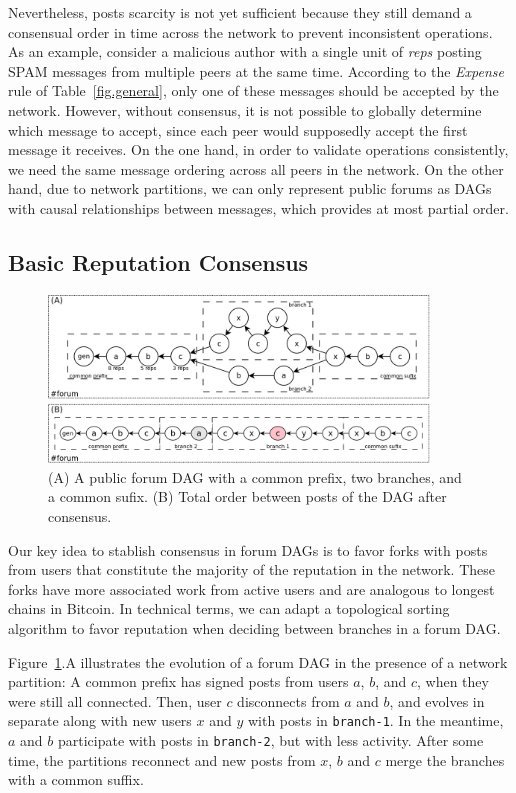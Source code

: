 \documentclass[12pt]{article}
\newcommand{\reps}     {\emph{reps}\xspace}
\newcommand{\code}[1]  {\texttt{\footnotesize{#1}}}
\begin{document}
Nevertheless, posts scarcity is not yet sufficient because they still demand a
consensual order in time across the network to prevent inconsistent operations.
As an example, consider a malicious author with a single unit of \reps posting
SPAM messages from multiple peers at the same time.
According to the \emph{Expense} rule of Table~\ref{fig.general}, only one of
these messages should be accepted by the network.
However, without consensus, it is not possible to globally determine which
message to accept, since each peer would supposedly accept the first message it
receives.
On the one hand, in order to validate operations consistently, we need the same
message ordering across all peers in the network.
On the other hand, due to network partitions, we can only represent public
forums as DAGs with causal relationships between messages, which provides at
most partial order.

\subsection{Basic Reputation Consensus}

\begin{figure}
\centering
\includegraphics[width=0.9\textwidth]{reps.png}
\caption{
    (A) A public forum DAG with a common prefix, two branches, and a common sufix.
    (B) Total order between posts of the DAG after consensus.
}
\label{fig.reps}
\end{figure}

Our key idea to stablish consensus in forum DAGs is to favor forks with posts
from users that constitute the majority of the reputation in the network.
These forks have more associated work from active users and are analogous to
longest chains in Bitcoin.
%
In technical terms, we can adapt a topological sorting algorithm to favor
reputation when deciding between branches in a forum DAG.

Figure~\ref{fig.reps}.A illustrates the evolution of a forum DAG in the
presence of a network partition:
A common prefix has signed posts from users $a$, $b$, and $c$, when they were
still all connected.
Then, user $c$ disconnects from $a$ and $b$, and evolves in separate along with
new users $x$ and $y$ with posts in \code{branch-1}.
In the meantime, $a$ and $b$ participate with posts in \code{branch-2}, but
with less activity.
After some time, the partitions reconnect and new posts from $x$, $b$ and $c$
merge the branches with a common suffix.
\end{document}
